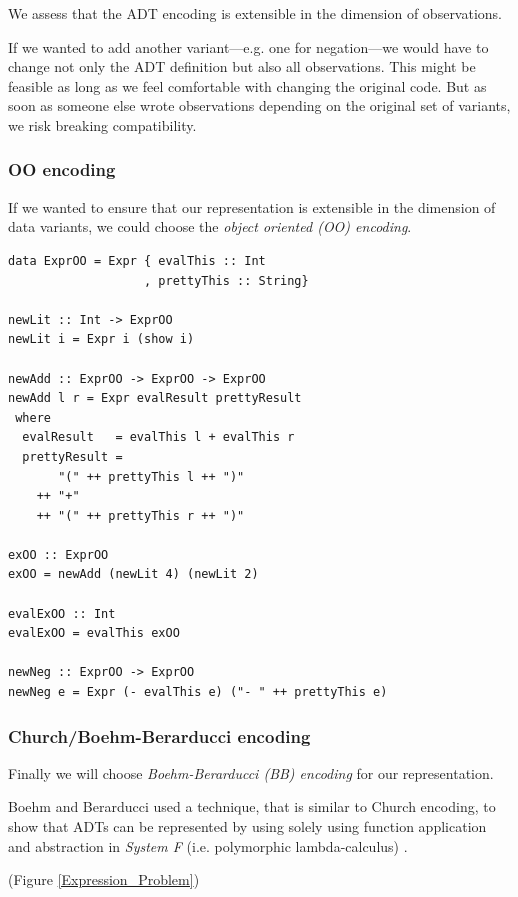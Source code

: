 We assess that the ADT encoding is extensible in the dimension of observations.

If we wanted to add another variant—e.g. one for negation—we would have to
change not only the ADT definition but also all observations. This might be
feasible as long as we feel comfortable with changing the original code. But as
soon as someone else wrote observations depending on the original set of
variants, we risk breaking compatibility.

\subsubsection{OO encoding}
If we wanted to ensure that our representation is extensible in the dimension of
data variants, we could choose the \emph{object oriented (OO) encoding}.
\begin{lstlisting}
data ExprOO = Expr { evalThis :: Int
                   , prettyThis :: String}

newLit :: Int -> ExprOO
newLit i = Expr i (show i)

newAdd :: ExprOO -> ExprOO -> ExprOO
newAdd l r = Expr evalResult prettyResult
 where
  evalResult   = evalThis l + evalThis r
  prettyResult =
       "(" ++ prettyThis l ++ ")"
    ++ "+"
    ++ "(" ++ prettyThis r ++ ")"

exOO :: ExprOO
exOO = newAdd (newLit 4) (newLit 2)

evalExOO :: Int
evalExOO = evalThis exOO

newNeg :: ExprOO -> ExprOO
newNeg e = Expr (- evalThis e) ("- " ++ prettyThis e)
\end{lstlisting}

\subsubsection{Church/Boehm-Berarducci encoding}

Finally we will choose \emph{Boehm-Berarducci (BB) encoding} for our
representation.

Boehm and Berarducci used a technique, that is similar to Church
encoding, to show that ADTs can be represented by using solely using function
application and abstraction in \emph{System F} (i.e. polymorphic
lambda-calculus) \cite{boehm_berarducci}.


(Figure \ref{Expression_Problem})


